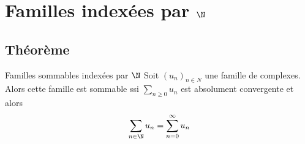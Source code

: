 \section{Familles indexées par \texorpdfstring{$\N$}{N}}
\subsection{Théorème}

\begin{theoreme}{Familles sommables indexées par $\N$}{}
    Soit $(u_n)_{n \in N}$ une famille de complexes. Alors
    cette famille est sommable ssi $\displaystyle \sum_{n \geqslant 0} u_n$ est 
    absolument convergente et alors 
    $$\sum_{n \in \N} u_n = \sum_{n = 0}^\infty u_n$$    
\end{theoreme}

